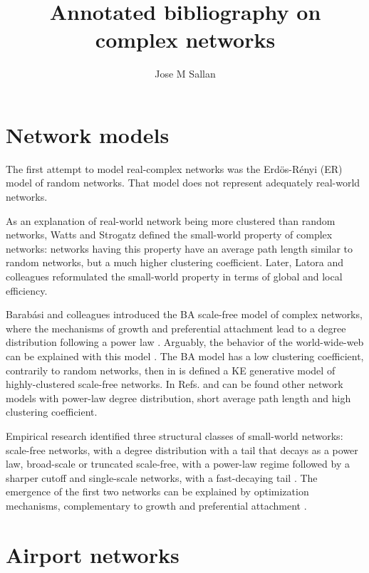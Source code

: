 \documentclass[12pt]{article}
\title{Annotated bibliography on complex networks}
\author{Jose M Sallan}
\date{}
\begin{document}
\maketitle

\section{Network models}

The first attempt to model real-complex networks was the Erdös-R\'enyi (ER) model of random networks. That model does not represent adequately real-world networks. \medskip

As an explanation of real-world network being more clustered than random networks, Watts and Strogatz \cite{Watts1998a} defined the small-world property of complex networks: networks having this property have an average path length similar to random networks, but a much higher clustering coefficient. Later, Latora and colleagues \cite{Latora2001} reformulated the small-world property in terms of global and local efficiency. \medskip

Barab\'asi and colleagues introduced the BA scale-free model of complex networks, where the mechanisms of growth and preferential attachment lead to a degree distribution following a power law \cite{BarabasiA.-L;Albert1999}. Arguably, the behavior of the world-wide-web can be explained with this model \cite{Barabasi2000}. The BA model has a low clustering coefficient, contrarily to random networks, then in \cite{Klemm2002} is defined a KE generative model of highly-clustered scale-free networks. In Refs. \cite{Holme2002d} and \cite{Ravasz2003} can be found other network models with power-law degree distribution, short average path length and high clustering coefficient.\medskip

Empirical research identified three structural classes of small-world networks: scale-free networks, with a degree distribution with a tail that decays as a power law, broad-scale or truncated scale-free, with a power-law regime followed by a  sharper cutoff and single-scale networks, with a  fast-decaying tail \cite{Amaral2000}. The emergence of the first two networks can be explained by optimization mechanisms, complementary to growth and preferential attachment \cite{Cancho2003}.

\section{Airport networks}
\end{document}
